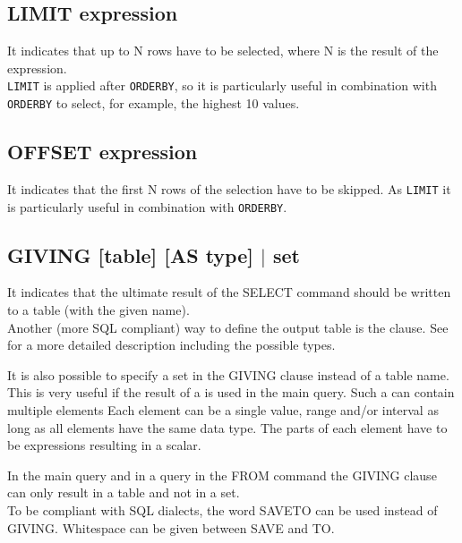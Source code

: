 \subsection{LIMIT expression}
It indicates that up to N rows have to be selected, where N is
the result of the expression. 
\\\texttt{LIMIT} is applied after \texttt{ORDERBY}, so it is
particularly useful in combination with
\texttt{ORDERBY} to select, for example, the highest 10 values.

\subsection{OFFSET expression}
It indicates that the first N rows of the selection have to be 
skipped. As \texttt{LIMIT} it is particularly useful in
combination with \texttt{ORDERBY}.

\subsection{\label{TAQL:GIVING}GIVING [table] [AS type] $|$ set}
It indicates that the ultimate result of the SELECT command should be
written to a table (with the given name).
\\Another (more SQL compliant) way to define the output table
is the  clause. See 
for a more detailed description including the possible types.

It is also possible to specify a set in the GIVING clause
instead of a table name. This is very useful if the result of a
 is used in the main query.
Such a  can contain multiple elements
Each element can be a single value, range and/or interval as
long as all elements have the same data type.
The parts of each element have to be expressions resulting in a scalar.

In the main query and in a query in the FROM command the
GIVING clause can only result in a table and not in a set.
\\To be compliant with SQL dialects, the word SAVETO can be
used instead of GIVING. Whitespace can be given between SAVE and TO.
 

